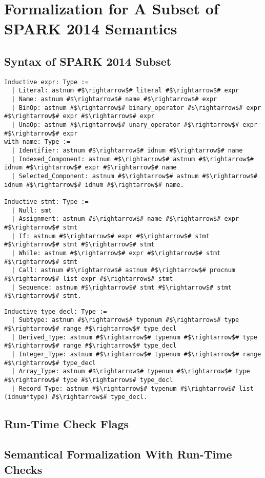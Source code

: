 \section{Formalization for A Subset of SPARK 2014 Semantics}
\subsection{Syntax of SPARK 2014 Subset}
\begin{lstlisting}[escapechar=\#]
Inductive expr: Type := 
  | Literal: astnum #$\rightarrow$# literal #$\rightarrow$# expr 
  | Name: astnum #$\rightarrow$# name #$\rightarrow$# expr 
  | BinOp: astnum #$\rightarrow$# binary_operator #$\rightarrow$# expr #$\rightarrow$# expr #$\rightarrow$# expr 
  | UnaOp: astnum #$\rightarrow$# unary_operator #$\rightarrow$# expr #$\rightarrow$# expr
with name: Type := 
  | Identifier: astnum #$\rightarrow$# idnum #$\rightarrow$# name 
  | Indexed_Component: astnum #$\rightarrow$# astnum #$\rightarrow$# idnum #$\rightarrow$# expr #$\rightarrow$# name 
  | Selected_Component: astnum #$\rightarrow$# astnum #$\rightarrow$# idnum #$\rightarrow$# idnum #$\rightarrow$# name.

Inductive stmt: Type := 
  | Null: smt 
  | Assignment: astnum #$\rightarrow$# name #$\rightarrow$# expr #$\rightarrow$# stmt 
  | If: astnum #$\rightarrow$# expr #$\rightarrow$# stmt #$\rightarrow$# stmt #$\rightarrow$# stmt 
  | While: astnum #$\rightarrow$# expr #$\rightarrow$# stmt #$\rightarrow$# stmt 
  | Call: astnum #$\rightarrow$# astnum #$\rightarrow$# procnum #$\rightarrow$# list expr #$\rightarrow$# stmt 
  | Sequence: astnum #$\rightarrow$# stmt #$\rightarrow$# stmt #$\rightarrow$# stmt.
\end{lstlisting}

\begin{lstlisting}[escapechar=\#]
Inductive type_decl: Type := 
  | Subtype: astnum #$\rightarrow$# typenum #$\rightarrow$# type #$\rightarrow$# range #$\rightarrow$# type_decl 
  | Derived_Type: astnum #$\rightarrow$# typenum #$\rightarrow$# type #$\rightarrow$# range #$\rightarrow$# type_decl 
  | Integer_Type: astnum #$\rightarrow$# typenum #$\rightarrow$# range #$\rightarrow$# type_decl
  | Array_Type: astnum #$\rightarrow$# typenum #$\rightarrow$# type #$\rightarrow$# type #$\rightarrow$# type_decl 
  | Record_Type: astnum #$\rightarrow$# typenum #$\rightarrow$# list (idnum*type) #$\rightarrow$# type_decl.
\end{lstlisting}


\subsection{Run-Time Check Flags}

\subsection{Semantical Formalization With Run-Time Checks}
